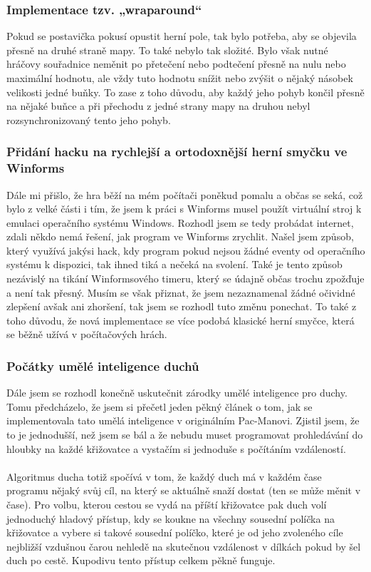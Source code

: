 \documentclass[a4]{article}
\begin{document}
\subsubsection{Implementace tzv. „wraparound“}
Pokud se postavička pokusí opustit herní pole, tak bylo potřeba, aby se objevila přesně na druhé straně mapy. To také nebylo tak složité. Bylo však nutné hráčovy souřadnice neměnit po přetečení nebo podtečení přesně na nulu nebo maximální hodnotu, ale vždy tuto hodnotu snížit nebo zvýšit o nějaký násobek velikosti jedné buňky. To zase z toho důvodu, aby každý jeho pohyb končil přesně na nějaké buňce a při přechodu z jedné strany mapy na druhou nebyl rozsynchronizovaný tento jeho pohyb.
\subsubsection{Přidání hacku na rychlejší a ortodoxnější herní smyčku ve Winforms}
Dále mi přišlo, že hra běží na mém počítači poněkud pomalu a občas se seká, což bylo z velké části i tím, že jsem k práci s Winforms musel použít virtuální stroj k emulaci operačního systému Windows. Rozhodl jsem se tedy probádat internet, zdali někdo nemá řešení, jak program ve Winforms zrychlit. Našel jsem způsob, který využívá jakýsi hack, kdy program pokud nejsou žádné eventy od operačního systému k dispozici, tak ihned tiká a nečeká na svolení. Také je tento způsob nezávislý na tikání Winformsového timeru, který se údajně občas trochu zpožďuje a není tak přesný. Musím se však přiznat, že jsem nezaznamenal žádné očividné zlepšení avšak ani zhoršení, tak jsem se rozhodl tuto změnu ponechat. To také z toho důvodu, že nová implementace se více podobá klasické herní smyčce, která se běžně užívá v počítačových hrách.
\subsubsection{Počátky umělé inteligence duchů}
Dále jsem se rozhodl konečně uskutečnit zárodky umělé inteligence pro duchy. Tomu předcházelo, že jsem si přečetl jeden pěkný článek o tom, jak se implementovala tato umělá inteligence v originálním Pac-Manovi. Zjistil jsem, že to je jednodušší, než jsem se bál a že nebudu muset programovat prohledávání do hloubky na každé křižovatce a vystačím si jednoduše s počítáním vzdáleností. 
\\\\
Algoritmus ducha totiž spočívá v tom, že každý duch má v každém čase programu nějaký svůj cíl, na který se aktuálně snaží dostat (ten se může měnit v čase). Pro volbu, kterou cestou se vydá na příští křižovatce pak duch volí jednoduchý hladový přístup, kdy se koukne na všechny sousední políčka na křižovatce a vybere si takové sousední políčko, které je od jeho zvoleného cíle nejbližší vzdušnou čarou nehledě na skutečnou vzdálenost v dílkách pokud by šel duch po cestě. Kupodivu tento přístup celkem pěkně funguje.
\end{document}
